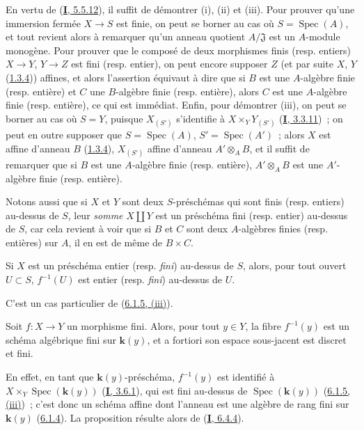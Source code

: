 
En vertu de (\hyperref[I.5.5.12-fr]{\textbf{I}, 5.5.12}), il suffit de démontrer (i),
(ii) et (iii). Pour prouver qu'une immersion fermée $X\to S$ est finie, on
peut se borner au cas où $S=\operatorname{Spec}(A)$, et tout revient alors à
remarquer qu'un anneau quotient $A/\mathfrak{J}$ est un $A$-module monogène.
Pour prouver que le composé de deux morphismes finis (resp. entiers) $X\to Y$,
$Y\to Z$ est fini (resp. entier), on peut encore supposer $Z$ (et par suite
$X$, $Y$ (\hyperref[II.1.3.4-fr]{1.3.4})) affines, et alors l'assertion
équivaut à dire que si $B$ est une $A$-algèbre finie (resp. entière) et $C$
une $B$-algèbre finie (resp. entière), alors $C$ est une $A$-algèbre finie
(resp. entière), ce qui est immédiat. Enfin, pour démontrer (iii), on peut se
borner au cas où $S=Y$, puisque $X_{(S')}$ s'identifie à
$X\times_Y Y_{(S')}$ (\hyperref[I.3.3.11-fr]{\textbf{I}, 3.3.11})~; on peut en outre
supposer que $S=\operatorname{Spec}(A)$, $S'=\operatorname{Spec}(A')$~; alors
$X$ est affine d'anneau $B$ (\hyperref[II.1.3.4-fr]{1.3.4}), $X_{(S')}$
affine d'anneau $A'\otimes_A B$, et il suffit de remarquer que si $B$ est une
$A$-algèbre finie (resp. entière), $A'\otimes_A B$ est une $A'$-algèbre finie
(resp. entière).

Notons aussi que si $X$ et $Y$ sont deux $S$-préschémas qui sont finis (resp.
entiers) au-dessus de $S$, leur \emph{somme} $X\amalg Y$ est un préschéma fini
(resp. entier) au-dessus de $S$, car cela revient à voir que si $B$ et $C$
sont deux $A$-algèbres finies (resp. entières) sur $A$, il en est de même de
$B\times C$.

\begin{corollary}[6.1.6]
\label{II.6.1.6-fr}
Si $X$ est un préschéma entier \textup{(resp. \emph{fini})} au-dessus de $S$, alors, pour tout
ouvert $U\subset S$, $f^{-1}(U)$ est entier \textup{(resp. \emph{fini})} au-dessus de $U$.
\end{corollary}

C'est un cas particulier de (\hyperref[II.6.1.5-fr]{6.1.5, (iii)}).

\begin{corollary}[6.1.7]
\label{II.6.1.7-fr}
Soit $f:X\to Y$ un morphisme fini. Alors, pour tout $y\in Y$, la fibre
$f^{-1}(y)$ est un schéma algébrique fini sur $\boldsymbol{k}(y)$, et \textup{a fortiori} son
espace sous-jacent est discret et fini.
\end{corollary}

En effet, en tant que $\boldsymbol{k}(y)$-préschéma, $f^{-1}(y)$ est identifié à
$X\times_Y\operatorname{Spec}(\boldsymbol{k}(y))$ (\hyperref[I.3.6.1-fr]{\textbf{I}, 3.6.1}), qui
est fini au-dessus de $\operatorname{Spec}(\boldsymbol{k}(y))$
(\hyperref[II.6.1.5-fr]{6.1.5, (iii)})~; c'est donc un schéma affine dont
l'anneau est une algèbre de rang fini sur $\boldsymbol{k}(y)$
(\hyperref[II.6.1.4-fr]{6.1.4}). La proposition résulte alors de
(\hyperref[I.6.4.4-fr]{\textbf{I}, 6.4.4}).

